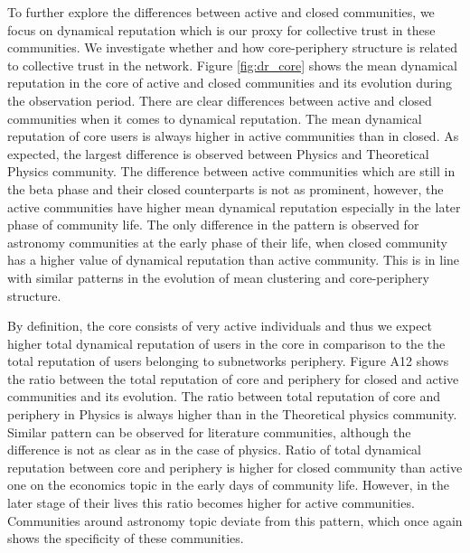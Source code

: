 To further explore the differences between active and closed communities, we focus on dynamical reputation which is our proxy for collective trust in these communities. We investigate whether and how core-periphery structure is related to collective trust in the network. Figure \ref{fig:dr_core} shows the mean dynamical reputation in the core of active and closed communities and its evolution during the observation period. There are clear differences between active and closed communities when it comes to dynamical reputation. The mean dynamical reputation of core users is always higher in active communities than in closed. As expected, the largest difference is observed between Physics and Theoretical Physics community. The difference between active communities which are still in the beta phase and their closed counterparts is not as prominent, however, the active communities have higher mean dynamical reputation especially in the later phase of community life. The only difference in the pattern is observed for astronomy communities at the early phase of their life, when closed community has a higher value of dynamical reputation than active community. This is in line with similar patterns in the evolution of mean clustering and core-periphery structure. 

By definition, the core consists of very active individuals and thus we expect higher total dynamical reputation of users in the core in comparison to the the total reputation of users belonging to subnetworks periphery. Figure A12 shows the ratio between the total reputation of core and periphery for closed and active communities and its evolution. The ratio between total reputation of core and periphery in Physics is always higher than in the Theoretical physics community. Similar pattern can be observed for literature communities, although the difference is not as clear as in the case of physics. Ratio of total dynamical reputation between core and periphery is higher for closed community than active one on the economics topic in the early days of community life. However, in the later stage of their lives this ratio becomes higher for active communities. Communities around astronomy topic deviate from this pattern, which once again shows the specificity of these communities. 

